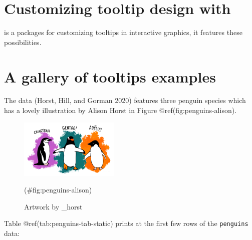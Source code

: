 \hypertarget{customizing-tooltip-design-with}{%
\section{\texorpdfstring{Customizing tooltip design with }{Customizing tooltip design with }}\label{customizing-tooltip-design-with}}

 is a packages for customizing tooltips in interactive graphics, it features these possibilities.

\hypertarget{a-gallery-of-tooltips-examples}{%
\section{A gallery of tooltips examples}\label{a-gallery-of-tooltips-examples}}

The  data (Horst, Hill, and Gorman 2020) features three penguin species which has a lovely illustration by Alison Horst in Figure @ref(fig:penguins-alison).

\begin{figure}
\includegraphics[width=1\linewidth,height=0.3\textheight]{penguins} \caption{Artwork by \@allison\_horst}(\#fig:penguins-alison)
\end{figure}

Table @ref(tab:penguins-tab-static) prints at the first few rows of the \texttt{penguins} data:

